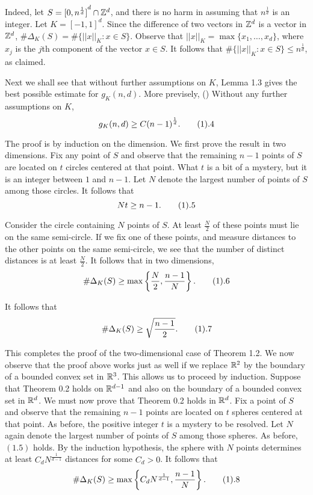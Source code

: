 Indeed, let $S={[0,n^{\frac{1}{d}}]}^d \cap {\Bbb Z}^d$, and there
is no harm in assuming that $n^{\frac{1}{d}}$ is an integer. Let
$K={[-1,1]}^d$. Since the difference of two vectors in ${\Bbb
Z}^d$ is a vector in ${\Bbb Z}^d$, $\# \Delta_K(S)=\# \{{||x||}_K:
x \in S\}$. Observe that ${||x||}_K=\max \{x_1, \dots, x_d\}$,
where $x_j$ is the $j$th component of the vector $x \in S$. It
follows that $\# \{{||x||}_K: x \in S\} \leq n^{\frac{1}{d}}$, as
claimed.

Next we shall see that without further assumptions on $K$, Lemma
1.3 gives the best possible estimate for $g_K(n,d)$. More
previsely,  (\cite{Erdos45}) Without any
further assumptions on $K$,
$$ g_K(n,d) \ge C{(n-1)}^{\frac{1}{d}}. \tag1.4$$
\endproclaim

The proof is by induction on the dimension. We first prove the
result in two dimensions. Fix any point of $S$ and observe that
the remaining $n-1$ points of $S$ are located on $t$ circles
centered at that point. What $t$ is a bit of a mystery, but it is
an integer between $1$ and $n-1$. Let $N$ denote the largest
number of points of $S$ among those circles. It follows that
$$ Nt \ge n-1. \tag1.5$$

Consider the circle containing $N$ points of $S$. At least
$\frac{N}{2}$ of these points must lie on the same semi-circle. If
we fix one of these points, and measure distances to the other
points on the same semi-circle, we see that the number of distinct
distances is at least $\frac{N}{2}$. It follows that in two
dimensions,
$$ \# \Delta_K(S) \ge \max \left\{\frac{N}{2}, \frac{n-1}{N} \right\}.
\tag1.6$$

It follows that
$$ \# \Delta_K(S) \ge \sqrt{\frac{n-1}{2}}. \tag1.7$$

This completes the proof of the two-dimensional case of Theorem
1.2. We now observe that the proof above works just as well if we
replace ${\Bbb R}^2$ by the boundary of a bounded convex set in
${\Bbb R}^3$. This allows us to proceed by induction. Suppose that
Theorem 0.2 holds on ${\Bbb R}^{d-1}$ and also on the boundary of
a bounded convex set in ${\Bbb R}^d$. We must now prove that
Theorem 0.2 holds in ${\Bbb R}^d$. Fix a point of $S$ and observe
that the remaining $n-1$ points are located on $t$ spheres
centered at that point. As before, the positive integer $t$ is a
mystery to be resolved. Let $N$ again denote the largest number of
points of $S$ among those spheres. As before, $(1.5)$ holds. By
the induction hypothesis, the sphere with $N$ points determines at
least $C_dN^{\frac{1}{d-1}}$ distances for some $C_d>0$. It
follows that
$$ \# \Delta_K(S) \ge \max \left\{C_dN^{\frac{1}{d-1}}, \frac{n-1}{N}
\right\}. \tag1.8$$

